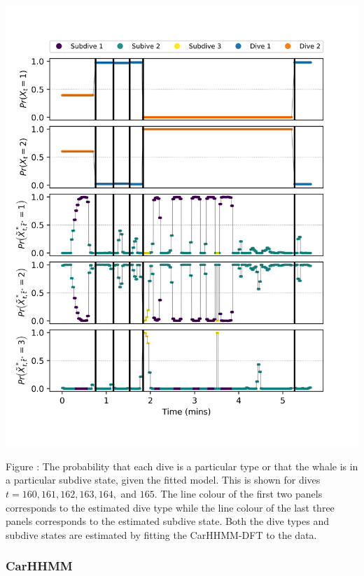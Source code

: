 \documentclass{article}
\begin{document}
        \begin{center}
        \includegraphics[width=6in]{../Plots/HHMM_decoded_states.png}
        \end{center}
        
        \noindent Figure : The probability that each dive is a particular type or that the whale is in a particular subdive state, given the fitted model. This is shown for dives $t = 160,161,162,163,164,$ and $165$. The line colour of the first two panels corresponds to the estimated dive type while the line colour of the last three panels corresponds to the estimated subdive state. Both the dive types and subdive states are estimated by fitting the CarHHMM-DFT to the data.
        \addtocounter{fignum}{1}
        
        \subsubsection{CarHHMM}
        
\end{document}

